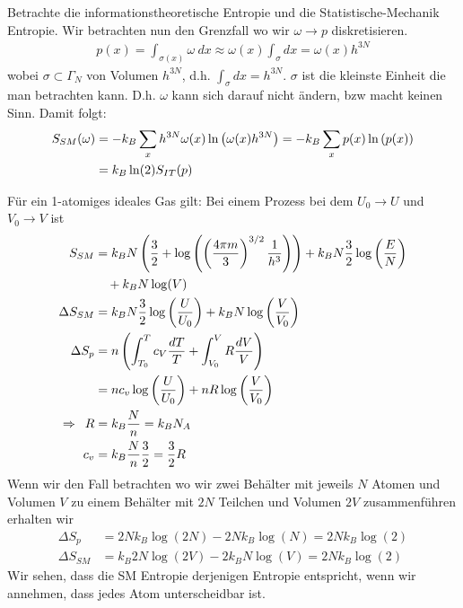Betrachte die informationstheoretische Entropie und die Statistische-Mechanik
Entropie. Wir betrachten nun den Grenzfall wo wir $\omega \rightarrow p$
diskretisieren.
\begin{align*}
    p(x) = \int_{\sigma(x)} \omega \ dx
    \approx \omega(x) \int_\sigma dx
    = \omega(x) h^{3N}
\end{align*}
wobei $\sigma \subset \Gamma_N$ von Volumen $h^{3N}$, d.h. $\int_\sigma dx = h^{3N}$.
$\sigma$ ist die kleinste Einheit die man betrachten kann. D.h. $\omega$ kann sich
darauf nicht ändern, bzw macht keinen Sinn. Damit folgt:
\begin{align*}
    S_{SM} (\omega) &= - k_B \sum_x h^{3N} \omega(x) \ln \left( \omega(x) h^{3N} \right)
    = - k_B \sum_x p(x) \ln \left( p(x) \right)
    \\
    &= k_B \ln(2) S_{IT} (p)
\end{align*}

Für ein 1-atomiges ideales Gas gilt: Bei einem Prozess bei dem $U_0 \rightarrow
U$ und $V_0 \rightarrow V$ ist
\begin{align*}
    S_{SM} &= k_B N \left( \frac{3}{2} + \log \left( \left( \frac{4 \pi m}{3} \right)^{3/2} \frac{1}{h^3} \right) \right)
        + k_B N \frac{3}{2} \log\left( \frac{E}{N} \right)
        \\ &\hspace{10pt}+ k_B N \log(V)
    \\
    \Delta S_{SM} &= k_B N \frac{3}{2} \log \left( \frac{U}{U_0} \right) + k_B N
        \log \left( \frac{V}{V_0} \right)
    \\
    \Delta S_{p} &= n \left( \int_{T_0}^T c_V \frac{dT}{T} + \int_{V_0}^V R \frac{dV}{V} \right)
    \\
    &= n c_v \log \left( \frac{U}{U_0} \right) + n R \log\left( \frac{V}{V_0} \right)
    \\
    \Rightarrow \hspace{5pt}
    R &= k_B \frac{N}{n} = k_B N_A
    \\
    c_v &= k_B \frac{N}{n} \frac{3}{2} = \frac{3}{2} R
\end{align*}
Wenn wir den Fall betrachten wo wir zwei Behälter mit jeweils $N$ Atomen und
Volumen $V$ zu einem Behälter mit $2N$ Teilchen und Volumen $2V$ zusammenführen
erhalten wir
\begin{align*}
    \Delta S_{p} &= 2N k_B \log(2N) - 2 N k_B \log(N) = 2N k_B \log(2)
    \\
    \Delta S_{SM} &= k_B 2N \log(2V) - 2 k_B N \log(V) = 2N k_B \log(2)
\end{align*}
Wir sehen, dass die SM Entropie derjenigen Entropie entspricht, wenn wir
annehmen, dass jedes Atom unterscheidbar ist.

